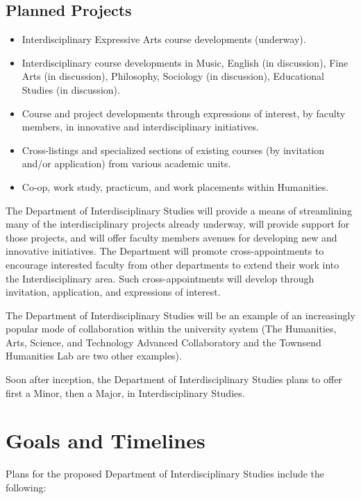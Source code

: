 \documentclass[12pt,DIV11,letterpaper,oneside,abstractoff,headsepline]{scrreprt}
\begin{document}
\subsection{Planned Projects}
\label{sec-2.2}

\begin{itemize}
\item Interdisciplinary Expressive Arts course developments (underway).
\item Interdisciplinary course developments in Music, English (in
     discussion), Fine Arts (in discussion), Philosophy, Sociology (in discussion), Educational Studies (in discussion).
\item Course and project developments through expressions of
     interest, by faculty members, in innovative and
     interdisciplinary initiatives.
\item Cross-listings and specialized sections of existing courses (by
     invitation and/or application) from various academic units.
\item Co-op, work study, practicum, and work placements within Humanities.
\end{itemize}

The Department of Interdisciplinary Studies will provide a means of streamlining many of the interdisciplinary projects already underway, will provide support for those projects, and will offer faculty members avenues for developing new and innovative initiatives. The Department will promote cross-appointments to encourage interested faculty from other departments to extend their work into the Interdisciplinary area. Such cross-appointments will develop through invitation, application, and expressions of interest.

The Department of Interdisciplinary Studies will be an example of an increasingly popular mode of collaboration within the university system (The Humanities, Arts, Science, and Technology Advanced Collaboratory and the Townsend Humanities Lab are two other examples).

Soon after inception, the Department of Interdisciplinary Studies plans to offer first a Minor, then a Major, in Interdisciplinary Studies.
\newpage

\section{Goals and Timelines}
\label{sec-3}

Plans for the proposed Department of Interdisciplinary Studies include the following:
\end{document}
